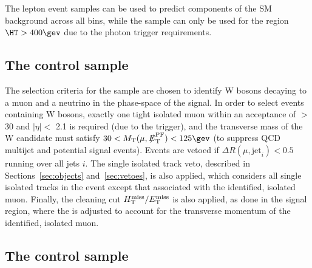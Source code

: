 The lepton event samples can be used to predict components of the SM
background across all \scalht bins, while the \gj sample can only be
used for the region $\HT > 400\gev$ due to the photon trigger
requirements.

\subsection{The \texorpdfstring{\mj}{muon plus jets} control sample}
\label{subsec:mucontrolSelection}


The selection criteria for the \mj sample are chosen to identify W
bosons decaying to a muon and a neutrino in the phase-space of the
signal. In order to select events containing W bosons, exactly one
tight isolated muon within an acceptance of \PT $>$ 30 \gev and
$|\eta| <$ 2.1 is required (due to the trigger), and the transverse
mass of the W candidate must satisfy $30 < \mt(\mu,\pfmet) < 125\gev$
(to suppress QCD multijet and potential signal events). Events are
vetoed if $\Delta R(\mu,\textrm{jet}_i) < 0.5$ running over all jets
$i$. The single isolated track veto, described in
Sections~\ref{sec:objects} and~\ref{sec:vetoes}, is also applied,
which considers all single isolated tracks in the event except that
associated with the identified, isolated muon. Finally, the cleaning
cut $\mbox{$H_{\rm T}^{\rm miss}$}/\mbox{$E_\text{T}^{\rm miss}$}$ is also applied, as done in the signal region, where
the \met is adjusted to account for the transverse momentum of the
identified, isolated muon.

\subsection{The \texorpdfstring{\mmj}{di-muon plus jets} control sample}
\label{subsec:mumucontrolSelection}


